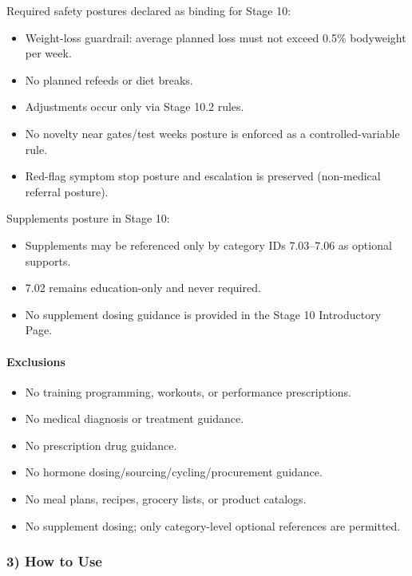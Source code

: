 \documentclass[10pt]{article}
\begin{document}
Required safety postures declared as binding for Stage 10:

\begin{itemize}
\item Weight-loss guardrail: average planned loss must not exceed 0.5\% bodyweight per week.
\item No planned refeeds or diet breaks.
\item Adjustments occur only via Stage 10.2 rules.
\item No novelty near gates/test weeks posture is enforced as a controlled-variable rule.
\item Red-flag symptom stop posture and escalation is preserved (non-medical referral posture).
\end{itemize}

Supplements posture in Stage 10:

\begin{itemize}
\item Supplements may be referenced only by category IDs 7.03–7.06 as optional supports.
\item 7.02 remains education-only and never required.
\item No supplement dosing guidance is provided in the Stage 10 Introductory Page.
\end{itemize}

\paragraph*{Exclusions}

\begin{itemize}
\item No training programming, workouts, or performance prescriptions.
\item No medical diagnosis or treatment guidance.
\item No prescription drug guidance.
\item No hormone dosing/sourcing/cycling/procurement guidance.
\item No meal plans, recipes, grocery lists, or product catalogs.
\item No supplement dosing; only category-level optional references are permitted.
\end{itemize}

\subsubsection*{3) How to Use}
\end{document}
